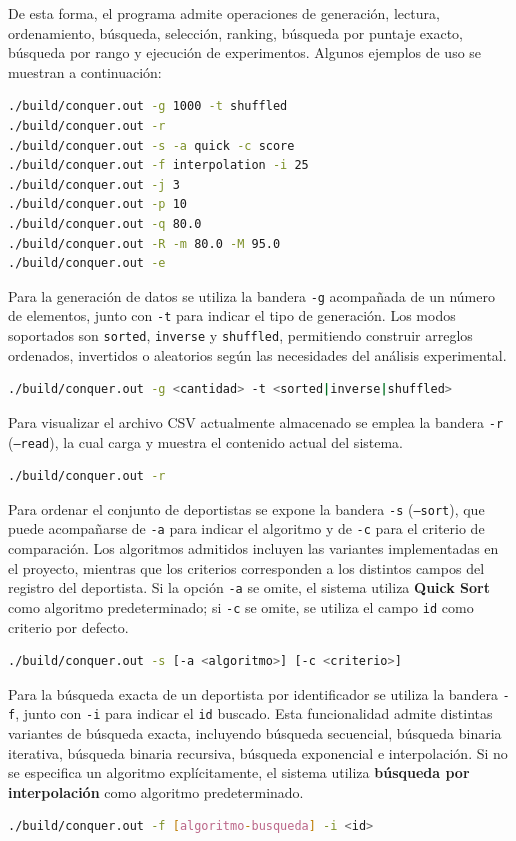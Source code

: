 De esta forma, el programa admite operaciones de generación, lectura, ordenamiento, búsqueda, selección, ranking, búsqueda por puntaje exacto, búsqueda por rango y ejecución de experimentos. Algunos ejemplos de uso se muestran a continuación:

\begin{lstlisting}[language=bash, style=CodeStyle]
./build/conquer.out -g 1000 -t shuffled
./build/conquer.out -r
./build/conquer.out -s -a quick -c score
./build/conquer.out -f interpolation -i 25
./build/conquer.out -j 3
./build/conquer.out -p 10
./build/conquer.out -q 80.0
./build/conquer.out -R -m 80.0 -M 95.0
./build/conquer.out -e
\end{lstlisting}

Para la generación de datos se utiliza la bandera \texttt{-g} acompañada de un número de elementos, junto con \texttt{-t} para indicar el tipo de generación. Los modos soportados son \texttt{sorted}, \texttt{inverse} y \texttt{shuffled}, permitiendo construir arreglos ordenados, invertidos o aleatorios según las necesidades del análisis experimental.
\begin{lstlisting}[language=bash, style=CodeStyle]
./build/conquer.out -g <cantidad> -t <sorted|inverse|shuffled>
\end{lstlisting}

Para visualizar el archivo CSV actualmente almacenado se emplea la bandera \texttt{-r} ({\small\texttt{--read}}), la cual carga y muestra el contenido actual del sistema.
\begin{lstlisting}[language=bash, style=CodeStyle]
./build/conquer.out -r
\end{lstlisting}

Para ordenar el conjunto de deportistas se expone la bandera \texttt{-s} ({\small\texttt{--sort}}), que puede acompañarse de \texttt{-a} para indicar el algoritmo y de \texttt{-c} para el criterio de comparación. Los algoritmos admitidos incluyen las variantes implementadas en el proyecto, mientras que los criterios corresponden a los distintos campos del registro del deportista. Si la opción \texttt{-a} se omite, el sistema utiliza \textbf{Quick Sort} como algoritmo predeterminado; si \texttt{-c} se omite, se utiliza el campo \texttt{id} como criterio por defecto.
\begin{lstlisting}[language=bash, style=CodeStyle]
./build/conquer.out -s [-a <algoritmo>] [-c <criterio>]
\end{lstlisting}

Para la búsqueda exacta de un deportista por identificador se utiliza la bandera \texttt{-f}, junto con \texttt{-i} para indicar el \texttt{id} buscado. Esta funcionalidad admite distintas variantes de búsqueda exacta, incluyendo búsqueda secuencial, búsqueda binaria iterativa, búsqueda binaria recursiva, búsqueda exponencial e interpolación. Si no se especifica un algoritmo explícitamente, el sistema utiliza \textbf{búsqueda por interpolación} como algoritmo predeterminado.
\begin{lstlisting}[language=bash, style=CodeStyle]
./build/conquer.out -f [algoritmo-busqueda] -i <id>
\end{lstlisting}

